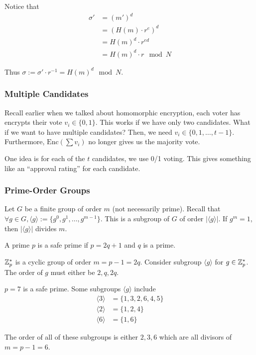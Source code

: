 Notice that 
\begin{align*}
    \sigma' &= (m')^d\\
    &= (H(m)\cdot r^e)^d\\
    &= H(m)^d \cdot r^{ed}\\
    &= H(m)^d \cdot r \mod N
\end{align*}

Thus $\sigma := \sigma' \cdot r^{-1} = H(m)^d \mod N$.

\subsubsection{Multiple Candidates}

Recall earlier when we talked about homomorphic encryption, each voter has encrypts their vote $v_i \in \{0, 1\}$. This works if we have only two candidates. What if we want to have multiple candidates? Then, we need $v_i \in \{0, 1, \dots, t-1\}$. Furthermore, $\text{Enc}(\sum v_i)$ no longer gives us the majority vote.

One idea is for each of the $t$ candidates, we use 0/1 voting. This gives something like an ``approval rating'' for each candidate. 

\subsubsection{Prime-Order Groups}

Let $G$ be a finite group of order $m$ (not necessarily prime). Recall that $\forall g \in G, \langle g \rangle := \{ g^0, g^1, \dots, g^{m-1}\}.$ This is a subgroup of $G$ of order $|\langle g\rangle |$. If $g^m = 1$, then $|\langle g \rangle |$ divides $m$.

\begin{definition}
    A prime $p$ is a safe prime if $p = 2q + 1$ and $q$ is a prime.
\end{definition}

\begin{lemma}
    $\mathbb Z_p^*$ is a cyclic group of order $m = p-1 = 2q$. Consider subgroup $\langle g \rangle$ for $g \in \mathbb Z_p^*$. The order of $g$ must either be $2, q, 2q$.
\end{lemma}
 
\begin{example}
    $p=7$ is a safe prime. Some subgroups $\langle g \rangle$ include
    \begin{align*}
        \langle 3 \rangle &= \{1, 3, 2, 6, 4, 5\} \\
        \langle 2 \rangle &= \{ 1, 2, 4\} \\
        \langle 6 \rangle &= \{1, 6\}
    \end{align*}

    The order of all of these subgroups is either $2, 3, 6$ which are all divisors of $m = p-1 = 6$.
\end{example}
